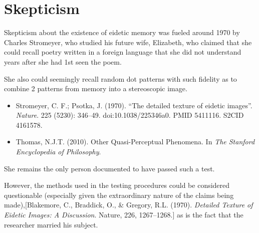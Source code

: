 \documentclass{book}
\numberwithin{equation}{section}
\begin{document}
\section{Skepticism}
Skepticism about the existence of eidetic memory was fueled around 1970 by Charles Stromeyer, who studied his future wife, Elizabeth, who claimed that she could recall poetry written in a foreign language that she did not understand years after she had 1st seen the poem.

She also could seemingly recall random dot patterns with such fidelity as to combine 2 patterns from memory into a stereoscopic image.
\begin{itemize}
    \item Stromeyer, C. F.; Psotka, J. (1970). ``The detailed texture of eidetic images''. \textit{Nature}. 225 (5230): 346--49. doi:10.1038/225346a0. PMID 5411116. S2CID 4161578.
    \item Thomas, N.J.T. (2010). Other Quasi-Perceptual Phenomena. In \textit{The Stanford Encyclopedia of Philosophy}.
\end{itemize}
She remains the only person documented to have passed such a test.

However, the methods used in the testing procedures could be considered questionable (especially given the extraordinary nature of the claims being made),[Blakemore, C., Braddick, O., \& Gregory, R.L. (1970). \textit{Detailed Texture of Eidetic Images: A Discussion}. Nature, 226, 1267--1268.] as is the fact that the researcher married his subject.
\end{document}
